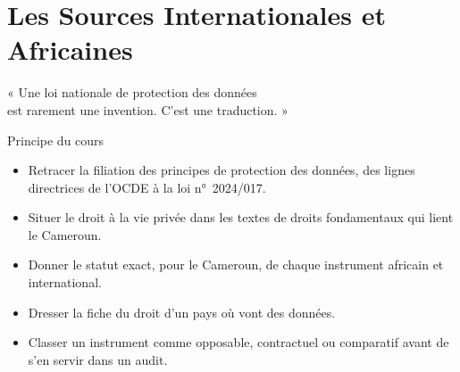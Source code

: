 
\chapter{Les Sources Internationales et Africaines}
\label{chap:international}

\epigraph{%
    « Une loi nationale de protection des données\\
    est rarement une invention. C'est une traduction. »%
}{Principe du cours}


\begin{boxobjectifs}
\begin{itemize}
    \item Retracer la filiation des principes de protection des données, des
          lignes directrices de l'OCDE à la loi n°~2024/017.
    \item Situer le droit à la vie privée dans les textes de droits
          fondamentaux qui lient le Cameroun.
    \item Donner le statut exact, pour le Cameroun, de chaque instrument
          africain et international.
    \item Dresser la fiche du droit d'un pays où vont des données.
    \item Classer un instrument comme opposable, contractuel ou comparatif
          avant de s'en servir dans un audit.
\end{itemize}
\end{boxobjectifs}

